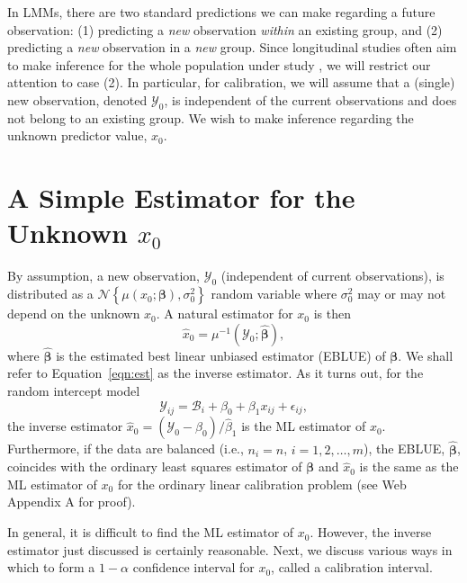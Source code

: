 \documentclass[useAMS,usenatbib,usegraphicx,referee]{biom}\usepackage[]{graphicx}\usepackage[]{color}
\begin{document}
In LMMs, there are two standard predictions we can make regarding a future observation: (1) predicting a \emph{new} observation \emph{within} an existing group, and (2) predicting a \emph{new} observation in a \emph{new} group. Since longitudinal studies often aim to make inference for the whole population under study \citep{jiang_distribution_2002}, we will restrict our attention to case (2). In particular, for calibration, we will assume that a (single) new observation, denoted $\mathscr{Y}_0$, is independent of the current observations and does not belong to an existing group. We wish to make inference regarding the unknown predictor value, $x_0$.

\section{A Simple Estimator for the Unknown $x_0$}
\label{sec:est}
By assumption, a new observation, $\mathscr{Y}_0$ (independent of current observations), is distributed as a $\mathcal{N}\left\{\mu\left(x_0; \bm{\beta}\right), \sigma_0^2\right\}$ random variable where $\sigma_0^2$ may or may not depend on the unknown $x_0$. A natural estimator for $x_0$ is then  
\begin{equation}
\label{eqn:est}
  \widehat{x}_0 = \mu^{-1}\left(\mathscr{Y}_0; \widehat{\bm{\beta}}\right),
\end{equation}
where $\widehat{\bm{\beta}}$ is the estimated best linear unbiased estimator (EBLUE) of $\bm{\beta}$. We shall refer to Equation~\eqref{eqn:est} as the inverse estimator. As it turns out, for the random intercept model
\[
  \mathscr{Y}_{ij} = \mathscr{B}_i + \beta_0 + \beta_1 x_{ij} + \epsilon_{ij},
\]
the inverse estimator $\widehat{x}_0 = (\mathscr{Y}_0 - \widehat{\beta}_0) / \widehat{\beta}_1$ is the ML estimator of $x_0$. Furthermore, if the data are balanced (i.e., $n_i = n$, $i = 1, 2, \dotsc, m$), the EBLUE, $\widehat{\bm{\beta}}$, coincides with the ordinary least squares estimator of $\bm{\beta}$ and $\widehat{x}_0$ is the same as the ML estimator of $x_0$ \citep{graybill_theory_1976} for the ordinary linear calibration problem (see Web Appendix A for proof).

In general, it is difficult to find the ML estimator of $x_0$. However, the inverse estimator just discussed is certainly reasonable. Next, we discuss various ways in which to form a $1-\alpha$ confidence interval for $x_0$, called a calibration interval. %
\end{document}
